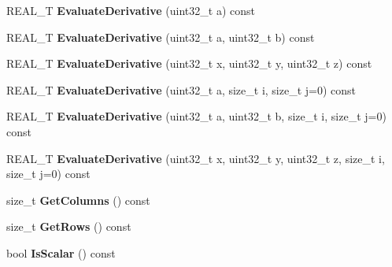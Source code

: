 \begin{DoxyCompactItemize}
\item 
\hypertarget{structatl_1_1_subtract_a1c024b42eec6f0b9bb60062f2a05fe60}{R\+E\+A\+L\+\_\+\+T {\bfseries Evaluate\+Derivative} (uint32\+\_\+t a) const }\label{structatl_1_1_subtract_a1c024b42eec6f0b9bb60062f2a05fe60}

\item 
\hypertarget{structatl_1_1_subtract_a8108d862d6282c0476c4fb5529233d50}{R\+E\+A\+L\+\_\+\+T {\bfseries Evaluate\+Derivative} (uint32\+\_\+t a, uint32\+\_\+t b) const }\label{structatl_1_1_subtract_a8108d862d6282c0476c4fb5529233d50}

\item 
\hypertarget{structatl_1_1_subtract_a1284210aba1ac90b41818eb93be2e097}{R\+E\+A\+L\+\_\+\+T {\bfseries Evaluate\+Derivative} (uint32\+\_\+t x, uint32\+\_\+t y, uint32\+\_\+t z) const }\label{structatl_1_1_subtract_a1284210aba1ac90b41818eb93be2e097}

\item 
\hypertarget{structatl_1_1_subtract_a2defe6bbcc739bbdd872fd23bdbb2306}{R\+E\+A\+L\+\_\+\+T {\bfseries Evaluate\+Derivative} (uint32\+\_\+t a, size\+\_\+t i, size\+\_\+t j=0) const }\label{structatl_1_1_subtract_a2defe6bbcc739bbdd872fd23bdbb2306}

\item 
\hypertarget{structatl_1_1_subtract_a6ca805f54a4cef65edb46507a208f732}{R\+E\+A\+L\+\_\+\+T {\bfseries Evaluate\+Derivative} (uint32\+\_\+t a, uint32\+\_\+t b, size\+\_\+t i, size\+\_\+t j=0) const }\label{structatl_1_1_subtract_a6ca805f54a4cef65edb46507a208f732}

\item 
\hypertarget{structatl_1_1_subtract_ae9ca2e237fac48dd380435215a8bc224}{R\+E\+A\+L\+\_\+\+T {\bfseries Evaluate\+Derivative} (uint32\+\_\+t x, uint32\+\_\+t y, uint32\+\_\+t z, size\+\_\+t i, size\+\_\+t j=0) const }\label{structatl_1_1_subtract_ae9ca2e237fac48dd380435215a8bc224}

\item 
\hypertarget{structatl_1_1_subtract_a855cb338fa3c5b1abd2c3ef7076d3da6}{size\+\_\+t {\bfseries Get\+Columns} () const }\label{structatl_1_1_subtract_a855cb338fa3c5b1abd2c3ef7076d3da6}

\item 
\hypertarget{structatl_1_1_subtract_a3178686169bc6c020f6191f0e1d89887}{size\+\_\+t {\bfseries Get\+Rows} () const }\label{structatl_1_1_subtract_a3178686169bc6c020f6191f0e1d89887}

\item 
\hypertarget{structatl_1_1_subtract_a230ee7ae322737b12c84136e534a5624}{bool {\bfseries Is\+Scalar} () const }\label{structatl_1_1_subtract_a230ee7ae322737b12c84136e534a5624}


\end{DoxyCompactItemize}

